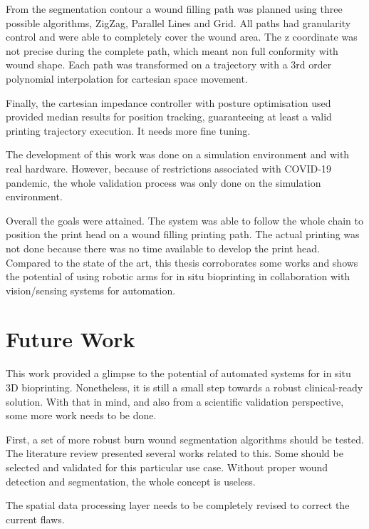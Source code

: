 From the segmentation contour a wound filling path was planned using three possible algorithms, ZigZag, Parallel Lines and Grid. All paths had granularity control and were able to completely cover the wound area. The z coordinate was not precise during the complete path, which meant non full conformity with wound shape. Each path was transformed on a trajectory with a 3rd order polynomial interpolation for cartesian space movement.

Finally, the cartesian impedance controller with posture optimisation used provided median results for position tracking, guaranteeing at least a valid printing trajectory execution. It needs more fine tuning.

The development of this work was done on a simulation environment and with real hardware. However, because of restrictions associated with COVID-19 pandemic, the whole validation process was only done on the simulation environment.

Overall the goals were attained. The system was able to follow the whole chain to position the print head on a wound filling printing path. The actual printing was not done because there was no time available to develop the print head. Compared to the state of the art, this thesis corroborates some works and shows the potential of using robotic arms for in situ bioprinting in collaboration with vision/sensing systems for automation.



\section{Future Work}
\label{sec:conclusions_future_work}

This work provided a glimpse to the potential of automated systems for in situ 3D bioprinting. Nonetheless, it is still a small step towards a robust clinical-ready solution. With that in mind, and also from a scientific validation perspective, some more work needs to be done.

First, a set of more robust burn wound segmentation algorithms should be tested. The literature review presented several works related to this. Some should be selected and validated for this particular use case. Without proper wound detection and segmentation, the whole concept is useless.

The spatial data processing layer needs to be completely revised to correct the current flaws.

